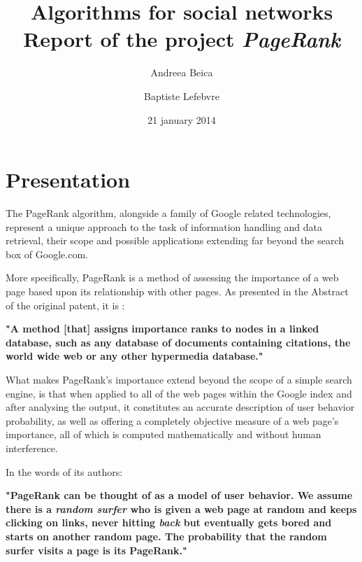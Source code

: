 \documentclass[pdftex,12pt,a4paper]{article}
\begin{document}
\title{
	\Large \textbf{Algorithms for social networks} \\
	\textsf{Report of the project \emph{PageRank}}
}
\author{Andreea Beica \and Baptiste Lefebvre}
\date{21 january 2014}

\maketitle


\section{Presentation}

The PageRank algorithm, alongside a family of Google related technologies, represent a unique approach to the task of information handling and data retrieval, their scope and possible applications extending far beyond the search box of Google.com.

More specifically, PageRank is a method of assessing the importance of a web page based upon its relationship with other pages. As presented in the Abstract of the original patent, it is :

\vspace{10pt}

\begin{centering}
\textbf{"A method [that] assigns importance ranks to nodes in a linked database, such as any database of documents containing citations, the world wide web or any other hypermedia database."}
\end{centering}
\vspace{10pt}

What makes PageRank's importance extend beyond the scope of a simple search engine, is that when applied to all of the web pages within the Google index and after analysing the output, it constitutes an accurate description of user behavior probability, as well as offering a completely objective measure of a web page's importance, all of which is computed mathematically and without human interference. 

In the words of its authors:

\vspace{10pt}

\begin{centering}
\textbf{"PageRank can be thought of as a model of user behavior. We assume there is a \emph{random surfer} who is given a web page at random and keeps clicking on links, never hitting \emph{back} but eventually gets bored and starts on another random page. The probability that the random surfer visits a page is its PageRank."}
\end{centering}
\vspace{10pt}
\end{document}
